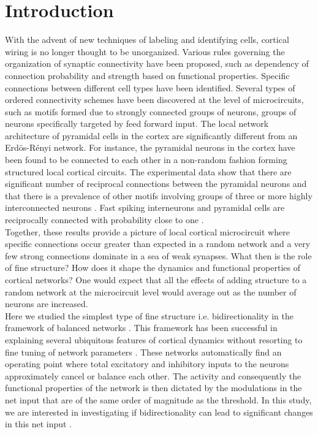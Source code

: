 \section{Introduction}

With the advent of new techniques of labeling and identifying cells, cortical wiring is no longer thought to be unorganized. Various rules governing the organization of synaptic connectivity have been proposed, such as dependency of connection probability and strength based on functional properties\cite{Ko2011, Cossell2015, Lee2016}.  Specific connections between different cell types have been identified. Several types of ordered connectivity schemes have been discovered at the level of microcircuits, such as motifs formed due to strongly connected groups of neurons, groups of neurons specifically targeted by feed forward input. The local network architecture of pyramidal cells in the cortex are significantly different from an Erdös-Rényi network. For instance, the pyramidal neurons in the cortex have been found to be connected to each other in a non-random fashion forming structured local cortical circuits. The experimental data show that there are significant number of reciprocal connections between the pyramidal neurons and that there is a prevalence of other motifs involving groups of three or more highly interconnected neurons \cite{markram1997,thomson2002, Song2005, Perin2011}. Fast spiking interneurons and pyramidal cells are reciprocally connected with probability close to one \cite{Yoshimura2005}.\\
Together, these results provide a picture of local cortical microcircuit where specific connections occur greater than expected in a random network and a very few strong connections dominate in a sea of weak synapses. What then is the role of fine structure? How does it shape the dynamics and functional properties of cortical networks? One would expect that all the effects of adding structure to a random network at the microcircuit level would average out as the number of neurons are increased.  \\

Here we studied the simplest type of fine structure i.e. bidirectionality in the framework of balanced networks \cite{carl1996, carl1998, carl2004}. This framework has been successful in explaining several ubiquitous features of cortical dynamics without resorting to fine tuning of network parameters \cite{softky1993, Holt1996, roxin2011}. These networks automatically find an operating point where total excitatory and inhibitory inputs to the neurons approximately cancel or balance each other. The activity and consequently the functional properties of the network is then dictated by the modulations in the net input that are of the same order of magnitude as the threshold. In this study, we are interested in investigating if bidirectionality can lead to significant changes in this net input . \\
	
